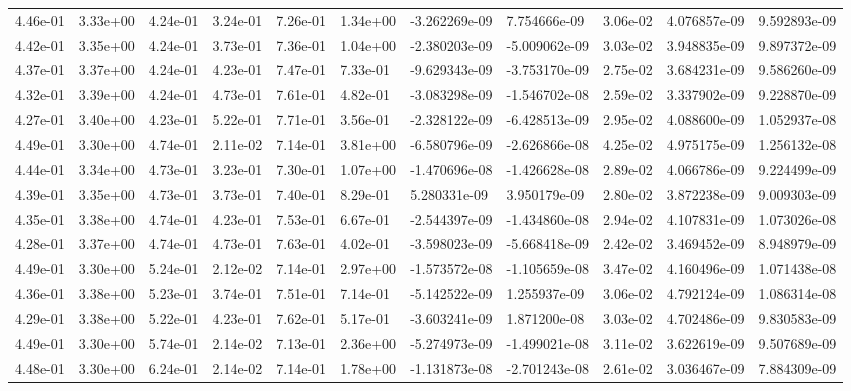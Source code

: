 \begin{longtable}{| p{} | p{} |}
4.46e-01 & 3.33e+00 & 4.24e-01 & 3.24e-01 & 7.26e-01 & 1.34e+00 & -3.262269e-09 &  7.754666e-09 &  3.06e-02 &  4.076857e-09 &  9.592893e-09 \\
4.42e-01 & 3.35e+00 & 4.24e-01 & 3.73e-01 & 7.36e-01 & 1.04e+00 & -2.380203e-09 & -5.009062e-09 &  3.03e-02 &  3.948835e-09 &  9.897372e-09 \\
4.37e-01 & 3.37e+00 & 4.24e-01 & 4.23e-01 & 7.47e-01 & 7.33e-01 & -9.629343e-09 & -3.753170e-09 &  2.75e-02 &  3.684231e-09 &  9.586260e-09 \\
4.32e-01 & 3.39e+00 & 4.24e-01 & 4.73e-01 & 7.61e-01 & 4.82e-01 & -3.083298e-09 & -1.546702e-08 &  2.59e-02 &  3.337902e-09 &  9.228870e-09 \\
4.27e-01 & 3.40e+00 & 4.23e-01 & 5.22e-01 & 7.71e-01 & 3.56e-01 & -2.328122e-09 & -6.428513e-09 &  2.95e-02 &  4.088600e-09 &  1.052937e-08 \\
4.49e-01 & 3.30e+00 & 4.74e-01 & 2.11e-02 & 7.14e-01 & 3.81e+00 & -6.580796e-09 & -2.626866e-08 &  4.25e-02 &  4.975175e-09 &  1.256132e-08 \\
4.44e-01 & 3.34e+00 & 4.73e-01 & 3.23e-01 & 7.30e-01 & 1.07e+00 & -1.470696e-08 & -1.426628e-08 &  2.89e-02 &  4.066786e-09 &  9.224499e-09 \\
4.39e-01 & 3.35e+00 & 4.73e-01 & 3.73e-01 & 7.40e-01 & 8.29e-01 &  5.280331e-09 &  3.950179e-09 &  2.80e-02 &  3.872238e-09 &  9.009303e-09 \\
4.35e-01 & 3.38e+00 & 4.74e-01 & 4.23e-01 & 7.53e-01 & 6.67e-01 & -2.544397e-09 & -1.434860e-08 &  2.94e-02 &  4.107831e-09 &  1.073026e-08 \\
4.28e-01 & 3.37e+00 & 4.74e-01 & 4.73e-01 & 7.63e-01 & 4.02e-01 & -3.598023e-09 & -5.668418e-09 &  2.42e-02 &  3.469452e-09 &  8.948979e-09 \\
4.49e-01 & 3.30e+00 & 5.24e-01 & 2.12e-02 & 7.14e-01 & 2.97e+00 & -1.573572e-08 & -1.105659e-08 &  3.47e-02 &  4.160496e-09 &  1.071438e-08 \\
4.36e-01 & 3.38e+00 & 5.23e-01 & 3.74e-01 & 7.51e-01 & 7.14e-01 & -5.142522e-09 &  1.255937e-09 &  3.06e-02 &  4.792124e-09 &  1.086314e-08 \\
4.29e-01 & 3.38e+00 & 5.22e-01 & 4.23e-01 & 7.62e-01 & 5.17e-01 & -3.603241e-09 &  1.871200e-08 &  3.03e-02 &  4.702486e-09 &  9.830583e-09 \\
4.49e-01 & 3.30e+00 & 5.74e-01 & 2.14e-02 & 7.13e-01 & 2.36e+00 & -5.274973e-09 & -1.499021e-08 &  3.11e-02 &  3.622619e-09 &  9.507689e-09 \\
4.48e-01 & 3.30e+00 & 6.24e-01 & 2.14e-02 & 7.14e-01 & 1.78e+00 & -1.131873e-08 & -2.701243e-08 &  2.61e-02 &  3.036467e-09 &  7.884309e-09 \\

\end{longtable}
